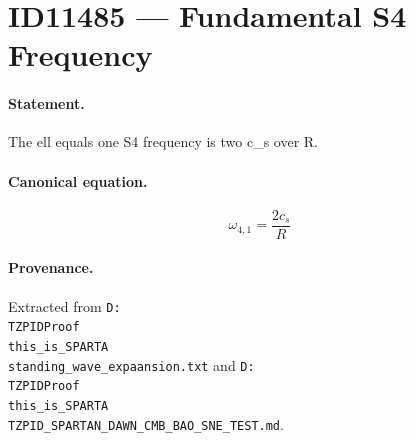 \section*{ID11485 --- Fundamental S4 Frequency}

\paragraph{Statement.}
The ell equals one S4 frequency is two c_s over R.

\paragraph{Canonical equation.}
\[
\omega_{4,1}=\frac{2c_s}{R}
\]

\paragraph{Provenance.}
Extracted from \texttt{D:\\TZPIDProof\\this\_is\_SPARTA\\standing\_wave\_expaansion.txt} and \texttt{D:\\TZPIDProof\\this\_is\_SPARTA\\TZPID\_SPARTAN\_DAWN\_CMB\_BAO\_SNE\_TEST.md}.
